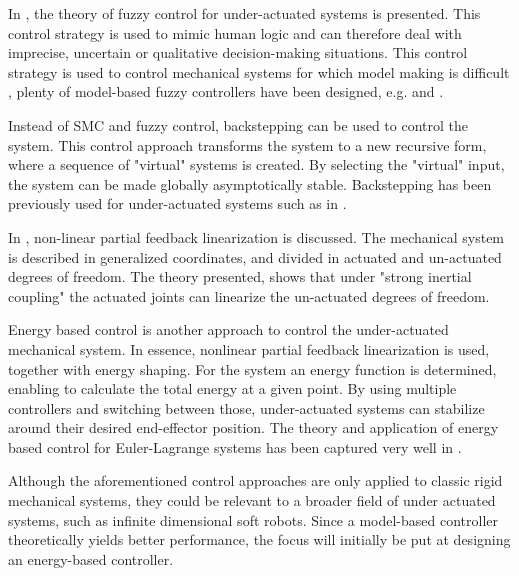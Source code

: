 In \cite{liu2013survey}, the theory of fuzzy control for under-actuated systems is presented. This control strategy is used to mimic human logic and can therefore deal with imprecise, uncertain or qualitative decision-making situations. This control strategy is used to control mechanical systems for which model making is difficult \cite{michels2007fuzzy}, plenty of model-based fuzzy controllers have been designed, e.g. \cite{begovich2002takagi} and \cite{tao2008design}. 

Instead of SMC and fuzzy control, backstepping \cite{khalil2002nonlinear} can be used to control the system. This control approach transforms the system to a new recursive form, where a sequence of "virtual" systems is created. By selecting the "virtual" input, the system can be made globally asymptotically stable. Backstepping has been previously used for under-actuated systems such as in \cite{madani2006backstepping}.

In \cite{spong1994linear}, non-linear partial feedback linearization is discussed. The mechanical system is described in generalized coordinates, and divided in actuated and un-actuated degrees of freedom. The theory presented, shows that under "strong inertial coupling" the actuated joints can linearize the un-actuated degrees of freedom. 

Energy based control \cite{spong1996energy} is another approach to control the under-actuated mechanical system. In essence, nonlinear partial feedback linearization is used, together with energy shaping. For the system an energy function is determined, enabling to calculate the total energy at a given point. By using multiple controllers and switching between those, under-actuated systems can stabilize around their desired end-effector position. The theory and application of energy based control for Euler-Lagrange systems has been captured very well in \cite{ortega2013passivity}.


Although the aforementioned control approaches are only applied to classic rigid mechanical systems, they could be relevant to a broader field of under actuated systems, such as infinite dimensional soft robots. Since a model-based controller theoretically yields better performance, the focus will initially be put at designing an energy-based controller.



